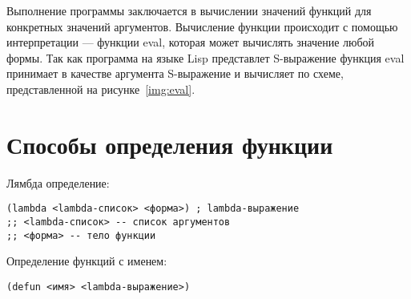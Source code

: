 Выполнение программы заключается в вычислении значений функций для конкретных
значений аргументов. Вычисление функции происходит с помощью интерпретации
--- функции eval, которая может вычислять значение любой формы. Так как
программа на языке Lisp представлет S-выражение функция eval принимает в
качестве аргумента S-выражение и вычисляет по схеме, представленной на
рисунке~\ref{img:eval}.


\section{Способы определения функции}

Лямбда определение:

\vspace{4mm}
\begin{minipage}{0.92\linewidth}
\begin{lstlisting}
(lambda <lambda-список> <форма>) ; lambda-выражение
;; <lambda-список> -- список аргументов
;; <форма> -- тело функции
\end{lstlisting}
\end{minipage}

Определение функций с именем:

\vspace{4mm}
\begin{minipage}{0.92\linewidth}
\begin{lstlisting}
(defun <имя> <lambda-выражение>)
\end{lstlisting}
\end{minipage}
